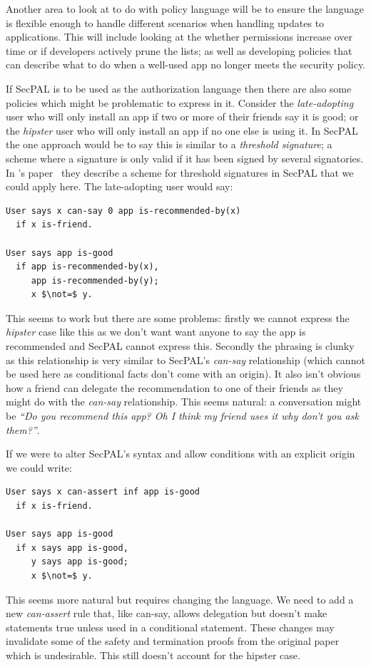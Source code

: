 \documentclass[a4paper]{article}
\begin{document}
Another area to look at to do with policy language will be to ensure the language
is flexible enough to handle different scenarios when handling updates to
applications.  This will include looking at the whether permissions increase
over time or if developers actively prune the lists; as well as developing
policies that can describe what to do when a well-used app no longer meets the
security policy.  

\label{secpal:problems}

If SecPAL is to be used as the authorization language then there are also some
policies which might be problematic to express in it.  Consider the
\emph{late-adopting} user who will only install an app if two or more of their
friends say it is good; or the \emph{hipster} user who will only install an app
if no one else is using it. In SecPAL the one approach would be to say this is
similar to a \emph{threshold signature}; a scheme where a signature is only
valid if it has been signed by several signatories.  In
\citeauthor*{Becker:2006vh}'s paper~\cite{Becker:2006vh} they describe a scheme
for threshold signatures in SecPAL that we could apply here.  The late-adopting user would
say: 

\begin{lstlisting}[language=SecPAL, mathescape=true] 
User says x can-say 0 app is-recommended-by(x)
  if x is-friend.

User says app is-good
  if app is-recommended-by(x),
     app is-recommended-by(y);
     x $\not=$ y.
\end{lstlisting}
This seems to work but there are some problems: firstly we cannot express the
\emph{hipster} case like this as we don't want want anyone to say the app is
recommended and SecPAL cannot express this.  Secondly the phrasing is clunky as
this relationship is very similar to SecPAL's \emph{can-say} relationship (which
cannot be used here as conditional facts don't come with an origin).  It also
isn't obvious how a friend can delegate the recommendation to one of their
friends as they might do with the \emph{can-say} relationship. This seems
natural: a conversation might be \emph{``Do you recommend this app? Oh I think
my friend uses it why don't you ask them?''}.  

If we were to alter SecPAL's syntax and allow conditions with an explicit origin
we could write:
\begin{lstlisting}[language=SecPAL, mathescape=true]
User says x can-assert inf app is-good
  if x is-friend.

User says app is-good
  if x says app is-good,
     y says app is-good;
     x $\not=$ y.
\end{lstlisting}
This seems more natural but requires changing the language. We need to add a new
\emph{can-assert} rule that, like can-say, allows delegation but doesn't make
statements true unless used in a conditional statement.  These changes may
invalidate some of the safety and termination proofs from the original
paper~\cite{Becker:2006vh} which is undesirable.  This still doesn't account for
the hipster case. 
\end{document}
